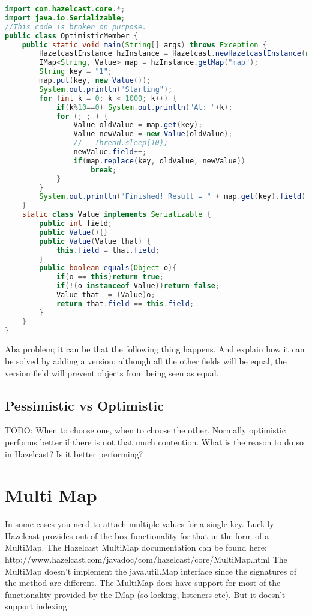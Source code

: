 \begin{lstlisting}[language=java]
import com.hazelcast.core.*;
import java.io.Serializable;
//This code is broken on purpose.
public class OptimisticMember {
    public static void main(String[] args) throws Exception {
        HazelcastInstance hzInstance = Hazelcast.newHazelcastInstance(null);
        IMap<String, Value> map = hzInstance.getMap("map");
        String key = "1";
        map.put(key, new Value());
        System.out.println("Starting");
        for (int k = 0; k < 1000; k++) {
            if(k%10==0) System.out.println("At: "+k);
            for (; ; ) {
                Value oldValue = map.get(key);
                Value newValue = new Value(oldValue);
                //   Thread.sleep(10);
                newValue.field++;
                if(map.replace(key, oldValue, newValue))
                    break;
            }
        }
        System.out.println("Finished! Result = " + map.get(key).field);
    }
    static class Value implements Serializable {
        public int field;
        public Value(){}
        public Value(Value that) {
            this.field = that.field;
        }
        public boolean equals(Object o){
            if(o == this)return true;
            if(!(o instanceof Value))return false;
            Value that  = (Value)o;
            return that.field == this.field;
        }
    }
}
\end{lstlisting}
Aba problem; it can be that the following thing happens. And explain how it can be solved by adding a version; although all the other fields will be equal, the version field will prevent objects from being seen as equal.

\subsection{Pessimistic vs Optimistic}
TODO: When to choose one, when to choose the other. Normally optimistic performs better if there is not that much contention. What is the reason to do so in Hazelcast? Is it better performing?

\section{Multi Map}
In some cases you need to attach multiple values for a single key. Luckily Hazelcast provides out of the box functionality for that in the form of a MultiMap. The Hazelcast MultiMap documentation can be found here: http://www.hazelcast.com/javadoc/com/hazelcast/core/MultiMap.html
The MultiMap doesn't implement the java.util.Map interface since the signatures of the method are different. The MultiMap does have support for most of the functionality provided by the IMap (so locking, listeners etc). But it doesn't support indexing.


